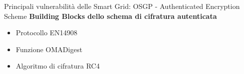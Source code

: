 

\begin{frame}{Principali vulnerabilità delle Smart Grid: OSGP - Authenticated Encryption Scheme}
	\textbf{Building Blocks dello schema di cifratura autenticata}
	\begin{itemize}
		\item Protocollo EN14908
		\item Funzione OMADigest
		\item Algoritmo di cifratura RC4
	\end{itemize}
\end{frame}

